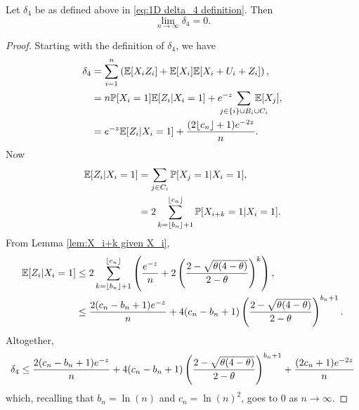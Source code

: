 	\begin{lemma}
	\label{lem:delta4 goes to 0}
		Let $\delta_4$ be as defined above in \eqref{eq:1D delta_4 definition}. Then
		\begin{equation}
			\lim_{n\rightarrow\infty} \delta_4 = 0.
		\end{equation}
	\end{lemma}
	\begin{proof}
		Starting with the definition of $\delta_4$, we have
		\begin{align}
			\delta_4 &= \sum_{i = 1}^n \left(\expect[X_i Z_i] + \expect[X_i]\expect[X_i + U_i + Z_i]\right),\\
				&= n \prob[X_i = 1] \expect[Z_i | X_i = 1] + \euler^{-z} \hspace{-15pt} \sum_{j \in \{i\}\cup B_i \cup C_i} \hspace{-15pt} \expect[X_j],\\
				&= \euler^{-z}\expect[Z_i | X_i = 1] + \frac{(2\lfloor c_n\rfloor+1)\euler^{-2z}}{n}.
		\end{align}
		Now
		\begin{align}
			\mathbb{E}[Z_i | X_i = 1] &= \sum_{j \in C_i} \mathbb{P}[X_j = 1 | X_i = 1],\\
			&= 2 \sum_{k = \lfloor b_n \rfloor + 1}^{\lfloor c_n\rfloor} \mathbb{P}[X_{i+k} = 1 | X_i = 1].
		\end{align}
		From Lemma \ref{lem:X_i+k given X_i},
		\begin{align}
			\mathbb{E}[Z_i | X_i = 1] &\leq 2 \sum_{k = \lfloor b_n\rfloor + 1}^{\lfloor c_n\rfloor} \left(\frac{e^{-z}}{n} + 2\left(\frac{2 - \sqrt{\theta(4 - \theta)}}{2 - \theta}\right)^k\right),\\
				&\leq \frac{2(c_n - b_n + 1)e^{-z}}{n} + 4(c_n - b_n + 1)\left(\frac{2 - \sqrt{\theta(4 - \theta)}}{2 - \theta}\right)^{b_n + 1}.
		\end{align}
		Altogether,
		\begin{equation}
			\delta_4 \leq \frac{2(c_n - b_n + 1)e^{-z}}{n} + 4(c_n - b_n + 1)\left(\frac{2 - \sqrt{\theta(4 - \theta)}}{2 - \theta}\right)^{b_n + 1} + \frac{(2c_n + 1)e^{-2z}}{n}
		\end{equation}
		which, recalling that $b_n = \ln(n)$ and $c_n = \ln(n)^2$, goes to $0$ as $n \rightarrow \infty$.
	\end{proof}
	
